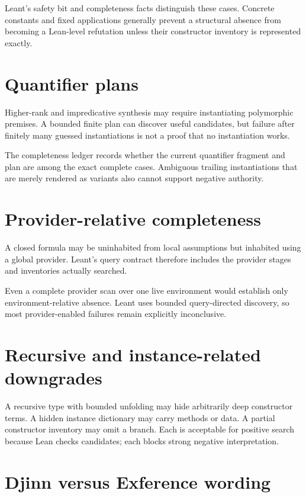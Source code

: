 \documentclass[10pt,letterpaper,oneside,openany]{report}
\begin{document}
Leant's safety bit and completeness facts distinguish these cases.  Concrete constants and fixed applications generally prevent a structural absence from becoming a Lean-level refutation unless their constructor inventory is represented exactly.

\section{Quantifier plans}

Higher-rank and impredicative synthesis may require instantiating polymorphic premises.  A bounded finite plan can discover useful candidates, but failure after finitely many guessed instantiations is not a proof that no instantiation works.

The completeness ledger records whether the current quantifier fragment and plan are among the exact complete cases.  Ambiguous trailing instantiations that are merely rendered as variants also cannot support negative authority.

\section{Provider-relative completeness}

A closed formula may be uninhabited from local assumptions but inhabited using a global provider.  Leant's query contract therefore includes the provider stages and inventories actually searched.

Even a complete provider scan over one live environment would establish only environment-relative absence.  Leant uses bounded query-directed discovery, so most provider-enabled failures remain explicitly inconclusive.

\section{Recursive and instance-related downgrades}

A recursive type with bounded unfolding may hide arbitrarily deep constructor terms.  A hidden instance dictionary may carry methods or data.  A partial constructor inventory may omit a branch.  Each is acceptable for positive search because Lean checks candidates; each blocks strong negative interpretation.

\section{Djinn versus Exference wording}
\end{document}
